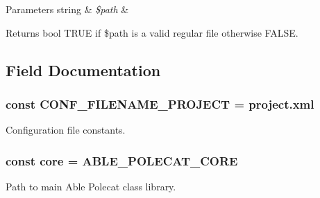 \begin{DoxyParams}[1]{Parameters}
string & {\em \$path} & \\
\hline
\end{DoxyParams}
\begin{DoxyReturn}{Returns}
bool T\+R\+U\+E if \$path is a valid regular file otherwise F\+A\+L\+S\+E. 
\end{DoxyReturn}


\subsection{Field Documentation}
\hypertarget{class_able_polecat___server___paths_ac9d1bf76f1ea8ee87b7a467b37036ddb}{}
\subsubsection[{C\+O\+N\+F\+\_\+\+F\+I\+L\+E\+N\+A\+M\+E\+\_\+\+P\+R\+O\+J\+E\+C\+T}]{\setlength{\rightskip}{0pt plus 5cm}const C\+O\+N\+F\+\_\+\+F\+I\+L\+E\+N\+A\+M\+E\+\_\+\+P\+R\+O\+J\+E\+C\+T = \textquotesingle{}project.\+xml\textquotesingle{}}\label{class_able_polecat___server___paths_ac9d1bf76f1ea8ee87b7a467b37036ddb}
Configuration file constants. \hypertarget{class_able_polecat___server___paths_ab17c2141d98ff28d51d1d48adb3d278b}{}
\subsubsection[{core}]{\setlength{\rightskip}{0pt plus 5cm}const core = A\+B\+L\+E\+\_\+\+P\+O\+L\+E\+C\+A\+T\+\_\+\+C\+O\+R\+E}\label{class_able_polecat___server___paths_ab17c2141d98ff28d51d1d48adb3d278b}
Path to main Able Polecat class library. \hypertarget{class_able_polecat___server___paths_a538dc0c3e85b782afe19d00972981ef1}{}
